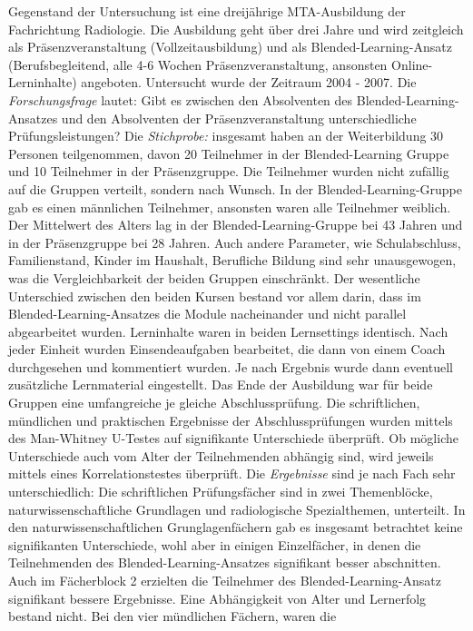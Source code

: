 Gegenstand der Untersuchung ist eine dreijährige MTA-Ausbildung der
Fachrichtung Radiologie. Die Ausbildung geht über drei Jahre und wird
zeitgleich als Präsenzveranstaltung (Vollzeitausbildung) und als
Blended-Learning-Ansatz (Berufsbegleitend, alle 4-6 Wochen
Präsenzveranstaltung, ansonsten Online-Lerninhalte) angeboten.
Untersucht wurde der Zeitraum 2004 - 2007. Die \emph{Forschungsfrage}
lautet: Gibt es zwischen den Absolventen des Blended-Learning-Ansatzes
und den Absolventen der Präsenzveranstaltung unterschiedliche
Prüfungsleistungen? Die \emph{Stichprobe:} insgesamt haben an der
Weiterbildung 30 Personen teilgenommen, davon 20 Teilnehmer in der
Blended-Learning Gruppe und 10 Teilnehmer in der Präsenzgruppe. Die
Teilnehmer wurden nicht zufällig auf die Gruppen verteilt, sondern nach
Wunsch. In der Blended-Learning-Gruppe gab es einen männlichen
Teilnehmer, ansonsten waren alle Teilnehmer weiblich. Der Mittelwert des
Alters lag in der Blended-Learning-Gruppe bei 43 Jahren und in der
Präsenzgruppe bei 28 Jahren. Auch andere Parameter, wie Schulabschluss,
Familienstand, Kinder im Haushalt, Berufliche Bildung sind sehr
unausgewogen, was die Vergleichbarkeit der beiden Gruppen einschränkt.
Der wesentliche Unterschied zwischen den beiden Kursen bestand vor allem
darin, dass im Blended-Learning-Ansatzes die Module nacheinander und
nicht parallel abgearbeitet wurden. Lerninhalte waren in beiden
Lernsettings identisch. Nach jeder Einheit wurden Einsendeaufgaben
bearbeitet, die dann von einem Coach durchgesehen und kommentiert
wurden. Je nach Ergebnis wurde dann eventuell zusätzliche Lernmaterial
eingestellt. Das Ende der Ausbildung war für beide Gruppen eine
umfangreiche je gleiche Abschlussprüfung. Die schriftlichen, mündlichen
und praktischen Ergebnisse der Abschlussprüfungen wurden mittels des
Man-Whitney U-Testes auf signifikante Unterschiede überprüft. Ob
mögliche Unterschiede auch vom Alter der Teilnehmenden abhängig sind,
wird jeweils mittels eines Korrelationstestes überprüft. Die
\emph{Ergebnisse} sind je nach Fach sehr unterschiedlich: Die
schriftlichen Prüfungsfächer sind in zwei Themenblöcke,
naturwissenschaftliche Grundlagen und radiologische Spezialthemen,
unterteilt. In den naturwissenschaftlichen Grunglagenfächern gab es
insgesamt betrachtet keine signifikanten Unterschiede, wohl aber in
einigen Einzelfächer, in denen die Teilnehmenden des
Blended-Learning-Ansatzes signifikant besser abschnitten. Auch im
Fächerblock 2 erzielten die Teilnehmer des Blended-Learning-Ansatz
signifikant bessere Ergebnisse. Eine Abhängigkeit von Alter und
Lernerfolg bestand nicht. Bei den vier mündlichen Fächern, waren die

